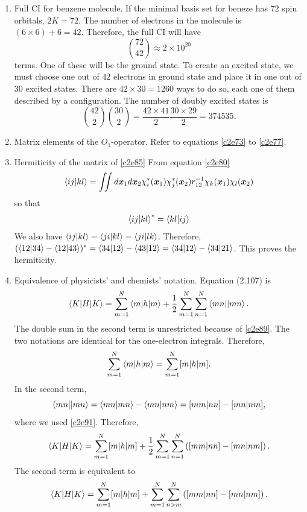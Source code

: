 \begin{enumerate}
We next consider,
\[
\braket{\psi_1|\psi_1} = \frac{\braket{\phi_1|\phi_1} + \braket{\phi_1|\phi_2}
+ \braket{\phi_2|\phi_1} + \braket{\phi_2|\phi_2}}{2(1 + S_{12})}
= \frac{1 + S_{12} + S_{12} + 1}{2(1 + S_{12})} = 1
\]
and
\[
\braket{\psi_2|\psi_2} = \frac{\braket{\phi_1|\phi_1} - \braket{\phi_1|\phi_2}
- \braket{\phi_2|\phi_1} + \braket{\phi_2|\phi_2}}{2(1 - S_{12})}
= \frac{1 - S_{12} - S_{12} + 1}{2(1 - S_{12})} = 1
\]

\item\label{c2p7} Full CI for benzene molecule.
If the minimal basis set for beneze has $72$ spin orbitals, $2K = 72$. The 
number of electrons in the molecule is $(6 \times 6) + 6 = 42$. Therefore, the
full CI will have
\[
\binom{72}{42} \approx 2 \times 10^{20}
\]
terms. One of these will be the ground state. To create an excited state, we
must choose one out of $42$ electrons in ground state and place it in one out
of $30$ excited states. There are $42 \times 30 = 1260$ ways to do so, each one
of them described by a configuration. The number of doubly excited states is
\[
\binom{42}{2}\binom{30}{2} = \frac{42 \times 41}{2}\frac{30 \times 29}{2} =
374535.
\]

\item Matrix elements of the $O_1$-operator.
Refer to equations \eqref{c2e73} to \eqref{c2e77}.

\item\label{c2p9} Hermiticity of the matrix of \eqref{c2e85}
From equation \eqref{c2e80}
\[
\braket{ij|kl} = \iint d\bm{x}_1d\bm{x}_2
\chi_i^\ast(\bm{x}_1)\chi_j^\ast(\bm{x}_2)r_{12}^{-1}
\chi_k(\bm{x}_1)\chi_l(\bm{x}_2)
\]
so that
\[
\braket{ij|kl}^\ast = \braket{kl|ij}
\]
We also have $\braket{ij|kl} = \braket{ji|kl} = \braket{ji|lk}$.
Therefore, $(\braket{12|34} - \braket{12|43})^\ast = \braket{34|12} - 
\braket{43|12} = \braket{34|12} - \braket{34|21}$. This proves the hermiticity.

\item\label{c2p10} Equivalence of physicists' and chemists' notation.
Equation (2.107) is
\[
\braket{K|H|K} = \sum_{m=1}^N\braket{m|h|m} + \frac{1}{2}\sum_{m=1}^N\sum_{n=1}^N
\braket{mn||mn}.
\]
The double sum in the second term is unrestricted because of \eqref{c2e89}.
The two notations are identical for the one-electron integrals. Therefore,
\[
\sum_{m=1}^N\braket{m|h|m} = \sum_{m=1}^N[m|h|m].
\]
In the second term,
\[
\braket{mn||mn} = \braket{mn|mn} - \braket{mn|nm} = [mm|nn] - [mn|nm],
\]
where we used \eqref{c2e91}. Therefore,
\[
\braket{K|H|K} = \sum_{m=1}^N[m|h|m] + \frac{1}{2}\sum_{m=1}^N\sum_{n=1}^N\left(
[mm|nn] - [mn|nm]\right).
\]
The second term is equivalent to
\[
\braket{K|H|K} = \sum_{m=1}^N[m|h|m] + \sum_{m=1}^N\sum_{n>m}^N\left([mm|nn] - 
[mn|nm]\right).
\]


\end{enumerate}
